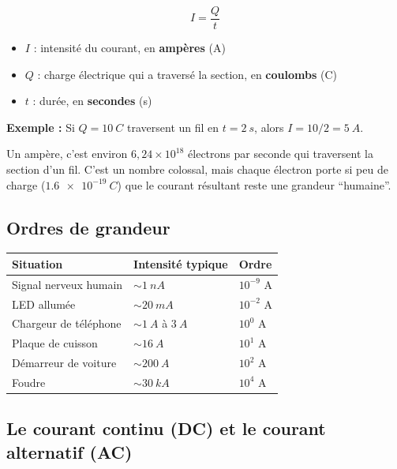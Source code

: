 \documentclass[12pt,a4paper,twoside]{book}
\begin{document}
\begin{formule}
\[
\boxed{I = \frac{Q}{t}}
\]
\begin{itemize}[nosep]
\item $I$ : intensité du courant, en \textbf{ampères} (A)
\item $Q$ : charge électrique qui a traversé la section, en \textbf{coulombs} (C)
\item $t$ : durée, en \textbf{secondes} (s)
\end{itemize}
\end{formule}

\textbf{Exemple :} Si $Q = \SI{10}{C}$ traversent un fil en $t = \SI{2}{s}$, alors $I = 10/2 = \SI{5}{A}$.

\begin{intuition}
Un ampère, c'est environ $6{,}24 \times 10^{18}$ électrons par seconde qui traversent la section d'un fil. C'est un nombre colossal, mais chaque électron porte si peu de charge ($\SI{1.6e-19}{C}$) que le courant résultant reste une grandeur ``humaine''.
\end{intuition}

\subsection{Ordres de grandeur}

\begin{center}
\begin{tabular}{lll}
\toprule
\textbf{Situation} & \textbf{Intensité typique} & \textbf{Ordre} \\
\midrule
Signal nerveux humain & $\sim \SI{1}{nA}$ & $10^{-9}$ A \\
LED allumée & $\sim \SI{20}{mA}$ & $10^{-2}$ A \\
Chargeur de téléphone & $\sim \SI{1}{A}$ à $\SI{3}{A}$ & $10^{0}$ A \\
Plaque de cuisson & $\sim \SI{16}{A}$ & $10^{1}$ A \\
Démarreur de voiture & $\sim \SI{200}{A}$ & $10^{2}$ A \\
Foudre & $\sim \SI{30}{kA}$ & $10^{4}$ A \\
\bottomrule
\end{tabular}
\end{center}

\subsection{Le courant continu (DC) et le courant alternatif (AC)}
\end{document}
